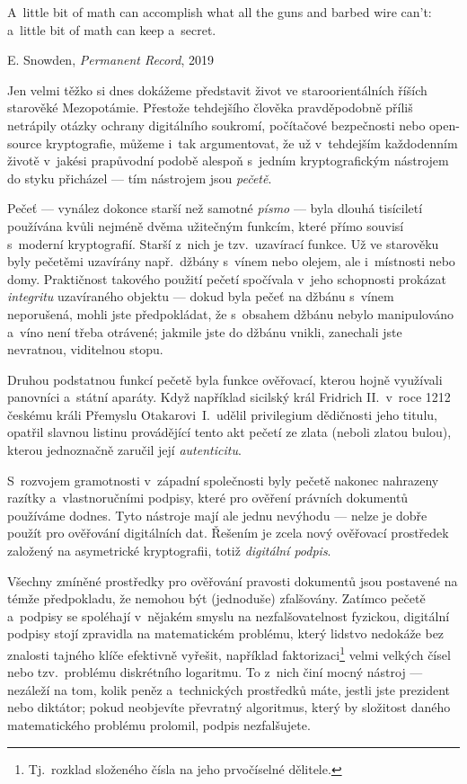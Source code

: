 
\epigraph{A~little bit of math can accomplish what all the guns and barbed wire can’t: a~little bit of math can keep a~secret.}{E. Snowden, \textit{Permanent Record}, 2019}

Jen velmi těžko si dnes dokážeme představit život ve staroorientálních říších starověké Mezopotámie. Přestože tehdejšího člověka pravděpodobně příliš netrápily otázky ochrany digitálního soukromí, počítačové bezpečnosti nebo open-source kryptografie, můžeme i~tak argumentovat, že už v~tehdejším každodenním životě v~jakési prapůvodní podobě alespoň s~jedním kryptografickým nástrojem do styku přicházel --- tím nástrojem jsou \emph{pečetě}.

Pečeť --- vynález dokonce starší než samotné \textit{písmo} --- byla dlouhá tisíciletí používána kvůli nejméně dvěma užitečným funkcím, které přímo souvisí s~moderní kryptografií. Starší z~nich je tzv.~u\-za\-ví\-ra\-cí funkce. Už ve starověku byly pečetěmi uzavírány např.\ džbány s~vínem nebo olejem, ale i~místnosti nebo domy. Praktičnost takového použití pečetí spočívala v~jeho schopnosti prokázat \emph{integritu} uzavíraného objektu --- dokud byla pečeť na džbánu s~vínem neporušená, mohli jste předpokládat, že s~obsahem džbánu nebylo manipulováno a~víno není třeba otrávené; jakmile jste do džbánu vnikli, zanechali jste nevratnou, viditelnou stopu.~\cite{sfragistika}

Druhou podstatnou funkcí pečetě byla funkce ověřovací, kterou hojně využívali panovníci a~státní aparáty. Když například sicilský král Fridrich II.\ v~roce 1212 českému králi Přemyslu Otakarovi~I.\ udělil privilegium dědičnosti jeho titulu, opatřil slavnou listinu provádějící tento akt pečetí ze zlata (neboli zlatou bulou), kterou jednoznačně zaručil její \emph{autenticitu}.~\cite{sfragistika, zlatabula}

S~rozvojem gramotnosti v~západní společnosti byly pečetě nakonec nahrazeny razítky a~vlastnoručními podpisy, které pro ověření právních dokumentů používáme dodnes. Tyto nástroje mají ale jednu nevýhodu --- nelze je dobře použít pro ověřování digitálních dat. Řešením je zcela nový ověřovací prostředek založený na asymetrické kryptografii, totiž \emph{digitální podpis}.

Všechny zmíněné prostředky pro ověřování pravosti dokumentů jsou postavené na témže předpokladu, že nemohou být (jednoduše) zfalšovány. Zatímco pečetě a~podpisy se spoléhají v~nějakém smyslu na nezfalšovatelnost fyzickou, digitální podpisy stojí zpravidla na matematickém problému, který lidstvo nedokáže bez znalosti tajného klíče efektivně vyřešit, například faktorizaci\footnote{Tj.~rozklad složeného čísla na jeho prvočíselné dělitele.} velmi velkých čísel nebo tzv.~problému diskrétního logaritmu. To z~nich činí mocný nástroj --- nezáleží na tom, kolik peněz a~technických prostředků máte, jestli jste prezident nebo diktátor; pokud neobjevíte převratný algoritmus, který by složitost daného matematického problému prolomil, podpis nezfalšujete.


